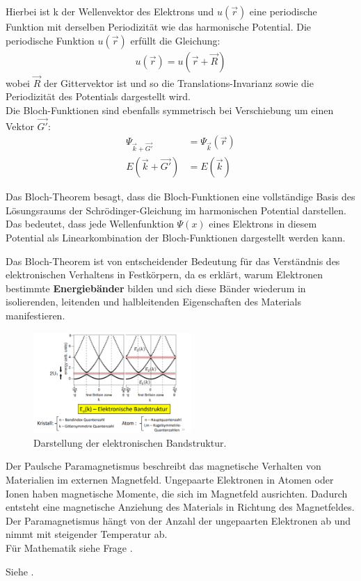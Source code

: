 Hierbei ist k der Wellenvektor des Elektrons und $u(\vec{r})$ eine periodische Funktion mit derselben Periodizität wie das harmonische Potential. Die periodische Funktion $u(\vec{r})$ erfüllt die Gleichung:
\begin{align}
    u(\vec{r}) = u(\vec{r}+\vec{R})
\end{align}
wobei $\vec{R} $ der Gittervektor ist und so die Translations-Invarianz sowie die Periodizität des Potentials dargestellt wird. \\

Die Bloch-Funktionen sind ebenfalls symmetrisch bei Verschiebung um einen Vektor $\vec{G'}$:
\begin{align}
    \Psi _{\vec{k} + \vec{G'}} &= \Psi _{\vec{k}} (\vec{r}) \\
    E(\vec{k} + \vec{G'}) &= E(\vec{k})
\end{align}

Das Bloch-Theorem besagt, dass die Bloch-Funktionen eine vollständige Basis des Lösungsraums der Schrödinger-Gleichung im harmonischen Potential darstellen. Das bedeutet, dass jede Wellenfunktion $\Psi(x)$ eines Elektrons in diesem Potential als Linearkombination der Bloch-Funktionen dargestellt werden kann.

Das Bloch-Theorem ist von entscheidender Bedeutung für das Verständnis des elektronischen Verhaltens in Festkörpern, da es erklärt, warum Elektronen bestimmte \textbf{Energiebänder} bilden und sich diese Bänder wiederum in isolierenden, leitenden und halbleitenden Eigenschaften des Materials manifestieren.

\begin{figure}
    \centering
    \includegraphics[width=6cm]{resources/05-05-2015/frage8_blochtheorem.PNG}
    \caption{Darstellung der elektronischen Bandstruktur.}
\end{figure}

\label{q:9}
Der Paulsche Paramagnetismus beschreibt das magnetische Verhalten von Materialien im externen Magnetfeld. Ungepaarte Elektronen in Atomen oder Ionen haben magnetische Momente, die sich im Magnetfeld ausrichten. Dadurch entsteht eine magnetische Anziehung des Materials in Richtung des Magnetfeldes. Der Paramagnetismus hängt von der Anzahl der ungepaarten Elektronen ab und nimmt mit steigender Temperatur ab. \\

Für Mathematik siehe Frage .


\label{q:10}

Siehe .


\newpage
